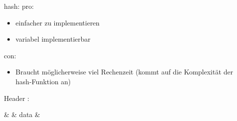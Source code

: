 hash:
pro:
\begin{itemize}
	\item einfacher zu implementieren
	\item variabel implementierbar
\end{itemize}
con:
\begin{itemize}
	\item Braucht möglicherweise viel Rechenzeit (kommt auf die Komplexität der hash-Funktion an)
\end{itemize}

\LARGE Header :
\normalsize
\begin{itemize}

\begin{bytefield}[bitwidth=1.1em][64]
	 &  &  {data} & 
\end{bytefield}

\end{itemize}

